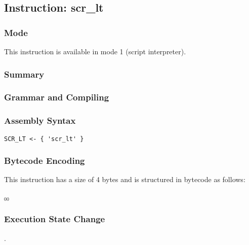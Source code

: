 \subsection{Instruction: scr\_lt}

\subsubsection{Mode}
This instruction is available in mode 1 (script interpreter).
\subsubsection{Summary}


\subsubsection{Grammar and Compiling}


\subsubsection{Assembly Syntax}

\begin{myquote}
\begin{verbatim}
SCR_LT <- { 'scr_lt' }
\end{verbatim}
\end{myquote}

\subsubsection{Bytecode Encoding}

This instruction has a size of 4 bytes and is structured in bytecode as follows:

$_{00}$\ 


\subsubsection{Execution State Change}

.


